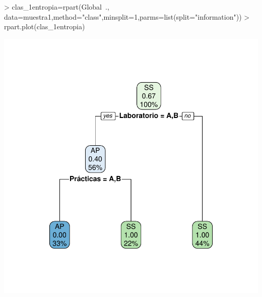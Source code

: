 \documentclass [a4paper] {article}
\begin{document}
\begin{center}
\begin{Schunk}
\begin{Sinput}
> clas_1entropia=rpart(Global~., data=muestra1,method="class",minsplit=1,parms=list(split="information"))
> rpart.plot(clas_1entropia)
\end{Sinput}
\end{Schunk}
\includegraphics{entrega2-rpart1_entropia}
\end{center}
\end{document}
